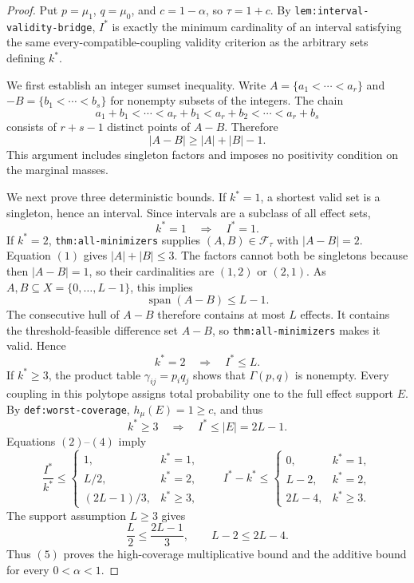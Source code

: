 \documentclass{article}
\begin{document}
\begin{proof}
Put \(p=\mu_1\), \(q=\mu_0\), and \(c=1-\alpha\), so \(\tau=1+c\).  By \texttt{lem:interval-validity-bridge}, \(I^*\) is exactly the minimum cardinality of an interval satisfying the same every-compatible-coupling validity criterion as the arbitrary sets defining \(k^*\).

We first establish an integer sumset inequality.  Write \(A=\{a_1<\cdots<a_r\}\) and \(-B=\{b_1<\cdots<b_s\}\) for nonempty subsets of the integers.  The chain
\[
a_1+b_1<\cdots<a_r+b_1<a_r+b_2<\cdots<a_r+b_s
\]
consists of \(r+s-1\) distinct points of \(A-B\).  Therefore
\[
|A-B|\geq |A|+|B|-1.
\tag{1}
\]
This argument includes singleton factors and imposes no positivity condition on the marginal masses.

We next prove three deterministic bounds.  If \(k^*=1\), a shortest valid set is a singleton, hence an interval.  Since intervals are a subclass of all effect sets,
\[
k^*=1\quad\Longrightarrow\quad I^*=1.
\tag{2}
\]
If \(k^*=2\), \texttt{thm:all-minimizers} supplies \((A,B)\in\mathcal F_{\tau}\) with \(|A-B|=2\).  Equation \((1)\) gives \(|A|+|B|\leq3\).  The factors cannot both be singletons because then \(|A-B|=1\), so their cardinalities are \((1,2)\) or \((2,1)\).  As \(A,B\subseteq X=\{0,\ldots,L-1\}\), this implies
\[
\operatorname{span}(A-B)\leq L-1.
\]
The consecutive hull of \(A-B\) therefore contains at most \(L\) effects.  It contains the threshold-feasible difference set \(A-B\), so \texttt{thm:all-minimizers} makes it valid.  Hence
\[
k^*=2\quad\Longrightarrow\quad I^*\leq L.
\tag{3}
\]
If \(k^*\geq3\), the product table \(\gamma_{ij}=p_iq_j\) shows that \(\Gamma(p,q)\) is nonempty.  Every coupling in this polytope assigns total probability one to the full effect support \(E\).  By \texttt{def:worst-coverage}, \(h_{\mu}(E)=1\geq c\), and thus
\[
k^*\geq3\quad\Longrightarrow\quad I^*\leq |E|=2L-1.
\tag{4}
\]
Equations \((2)\)--\((4)\) imply
\[
\frac{I^*}{k^*}\leq
\begin{cases}
1,&k^*=1,\\
L/2,&k^*=2,\\
(2L-1)/3,&k^*\geq3,
\end{cases}
\qquad
I^*-k^*\leq
\begin{cases}
0,&k^*=1,\\
L-2,&k^*=2,\\
2L-4,&k^*\geq3.
\end{cases}
\tag{5}
\]
The support assumption \(L\geq3\) gives
\[
\frac L2\leq\frac{2L-1}{3},
\qquad
L-2\leq2L-4.
\]
Thus \((5)\) proves the high-coverage multiplicative bound and the additive bound for every \(0<\alpha<1\).


\end{proof}
\end{document}
